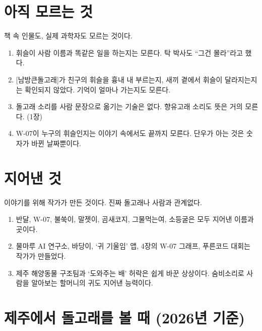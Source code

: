 \documentclass[
  korean,
  letterpaper,
  twoside,
  open=any,
  fontsize=12.5pt,
  headings=small]{scrbook}
\providecommand{\tightlist}{%
  \setlength{\itemsep}{0pt}\setlength{\parskip}{0pt}}
\begin{document}
\section*{아직 모르는
것}\label{uxc544uxc9c1-uxbaa8uxb974uxb294-uxac83}


책 속 인물도, 실제 과학자도
모르는 것이다.

\begin{enumerate}
\def\labelenumi{\arabic{enumi}.}
\setcounter{enumi}{9}
\tightlist
\item
  휘슬이 사람 이름과 똑같은
  일을 하는지는 모른다. 탁
  박사도 ``그건 몰라''라고
  했다.
\item
  {[}남방큰돌고래{]}가 친구의
  휘슬을 흉내 내 부르는지,
  새끼 곁에서 휘슬이
  달라지는지는 확인되지
  않았다. 기억이 얼마나
  가는지도 모른다.
\item
  돌고래 소리를 사람 문장으로
  옮기는 기술은 없다. 향유고래
  소리도 뜻은 거의 모른다.
  (1장)
\item
  W-07이 누구의 휘슬인지는
  이야기 속에서도 끝까지
  모른다. 단우가 아는 것은
  숫자가 바뀐 날짜뿐이다.
\end{enumerate}

\section*{지어낸
것}\label{uxc9c0uxc5b4uxb0b8-uxac83}


이야기를 위해 작가가 만든
것이다. 진짜 돌고래나 사람과
관계없다.

\begin{enumerate}
\def\labelenumi{\arabic{enumi}.}
\setcounter{enumi}{13}
\tightlist
\item
  반달, W-07, 불쑥이, 말젯이,
  곰새코지, 그물먹는여,
  소등굴은 모두 지어낸 이름과
  곳이다.
\item
  물마루 AI 연구소, 바당이,
  `귀 기울임' 앱, 4장의 W-07
  그래프, 푸른코드 대회는
  작가가 만들었다.
\item
  제주 해양동물 구조팀과
  `도와주는 배' 허락은 쉽게
  바꾼 상상이다. 숨비소리로
  사람을 알아보는 할머니의
  귀도 지어낸 능력이다.
\end{enumerate}

\section*{제주에서 돌고래를 볼
때 (2026년
기준)}\label{uxc81cuxc8fcuxc5d0uxc11c-uxb3ccuxace0uxb798uxb97c-uxbcfc-uxb54c-2026uxb144-uxae30uxc900}
\end{document}
